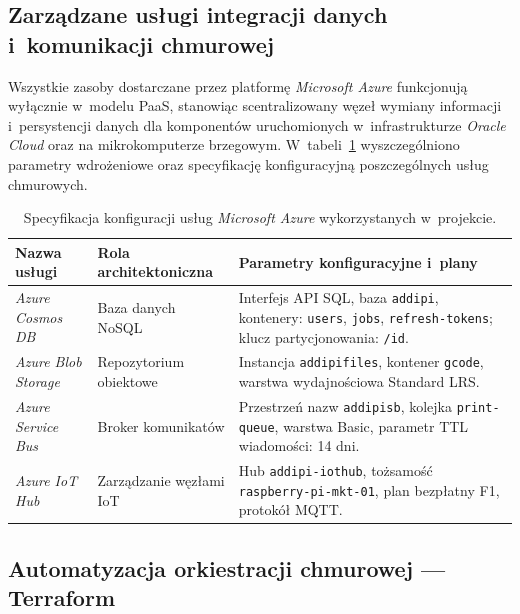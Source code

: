 \documentclass[a4paper,12pt,reqno]{article}
\begin{document}
\subsection{Zarządzane usługi integracji danych i~komunikacji chmurowej}

Wszystkie zasoby dostarczane przez platformę \textit{Microsoft Azure} funkcjonują wyłącznie w~modelu PaaS, stanowiąc scentralizowany węzeł wymiany informacji i~persystencji danych dla komponentów uruchomionych w~infrastrukturze \textit{Oracle Cloud} oraz na mikrokomputerze brzegowym. W~tabeli~\ref{tab:azure_services_config} wyszczególniono parametry wdrożeniowe oraz specyfikację konfiguracyjną poszczególnych usług chmurowych.

\begin{table}[htbp]
	\centering
	\caption{Specyfikacja konfiguracji usług \textit{Microsoft Azure} wykorzystanych w~projekcie.}
	\label{tab:azure_services_config}
	\begin{tabular}{llp{6cm}}
		\toprule
		\textbf{Nazwa usługi} & \textbf{Rola architektoniczna} & \textbf{Parametry konfiguracyjne i~plany} \\
		\midrule
		\textit{Azure Cosmos DB} & Baza danych NoSQL & Interfejs API SQL, baza \texttt{addipi}, kontenery: \texttt{users}, \texttt{jobs}, \texttt{refresh-tokens}; klucz partycjonowania: \texttt{/id}. \\
		\addlinespace
		\textit{Azure Blob Storage} & Repozytorium obiektowe & Instancja \texttt{addipifiles}, kontener \texttt{gcode}, warstwa wydajnościowa Standard LRS. \\
		\addlinespace
		\textit{Azure Service Bus} & Broker komunikatów & Przestrzeń nazw \texttt{addipisb}, kolejka \texttt{print-queue}, warstwa Basic, parametr TTL wiadomości: 14 dni. \\
		\addlinespace
		\textit{Azure IoT Hub} & Zarządzanie węzłami IoT & Hub \texttt{addipi-iothub}, tożsamość \texttt{raspberry-pi-mkt-01}, plan bezpłatny F1, protokół MQTT. \\
		\bottomrule
	\end{tabular}
\end{table}


\subsection{Automatyzacja orkiestracji chmurowej --- Terraform}
\end{document}
